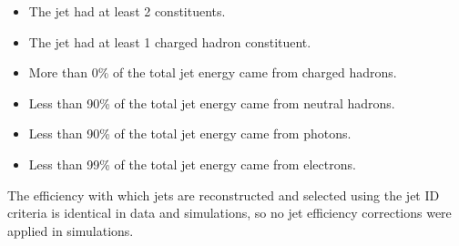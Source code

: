 \begin{itemize}
	\item The jet had at least 2 constituents.
	\item The jet had at least 1 charged hadron constituent.
	\item More than 0\% of the total jet energy came from charged hadrons.
	\item Less than 90\% of the total jet energy came from neutral hadrons.
	\item Less than 90\% of the total jet energy came from photons.
	\item Less than 99\% of the total jet energy came from electrons.
\end{itemize}

The efficiency with which jets are reconstructed and selected using the jet ID criteria is identical in data and simulations, so 
no jet efficiency corrections were applied in simulations.



%


